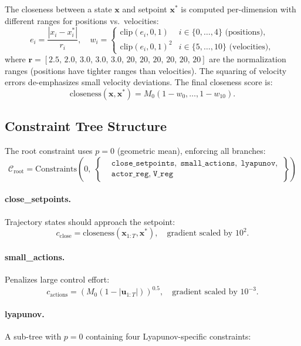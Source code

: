 \documentclass[11pt]{article}
\newcommand{\pmean}[2]{M_{#1}\!\left(#2\right)}
\newcommand{\x}{\bm{x}}
\newcommand{\xstar}{\bm{x}^*}
\newcommand{\uu}{\bm{u}}
\theoremstyle{definition}
\begin{document}
The closeness between a state $\x$ and setpoint $\xstar$ is computed
per-dimension with different ranges for positions vs.\ velocities:
\begin{equation}
    e_i = \frac{|x_i - x^*_i|}{r_i}, \quad
    w_i = \begin{cases}
        \text{clip}(e_i, 0, 1) & i \in \{0,\dots,4\} \text{ (positions)},\\
        \text{clip}(e_i, 0, 1)^2 & i \in \{5,\dots,10\} \text{ (velocities)},
    \end{cases}
\end{equation}
where $\bm{r} = [2.5,\, 2.0,\, 3.0,\, 3.0,\, 3.0,\, 20,\, 20,\, 20,\, 20,\, 20,\, 20]$
are the normalization ranges (positions have tighter ranges than velocities).
The squaring of velocity errors de-emphasizes small velocity deviations.
The final closeness score is:
\[
    \text{closeness}(\x, \xstar) = \pmean{0}{1 - w_0, \dots, 1 - w_{10}}.
\]

\subsection{Constraint Tree Structure}

The root constraint uses $p = 0$ (geometric mean), enforcing all branches:
\[
    \mathcal{C}_{\text{root}} = \text{Constraints}\!\left(0,\;
    \left\{
    \begin{aligned}
        &\texttt{close\_setpoints},\;
         \texttt{small\_actions},\;
         \texttt{lyapunov},\\
        &\texttt{actor\_reg},\;
         \texttt{V\_reg}
    \end{aligned}
    \right\}
    \right)
\]

\paragraph{close\_setpoints.}
Trajectory states should approach the setpoint:
\[
    c_{\text{close}} = \text{closeness}(\x_{1:T}, \xstar),
    \quad \text{gradient scaled by } 10^2.
\]

\paragraph{small\_actions.}
Penalizes large control effort:
\[
    c_{\text{actions}} = \left(\pmean{0}{1 - |\uu_{1:T}|}\right)^{0.5},
    \quad \text{gradient scaled by } 10^{-3}.
\]

\paragraph{lyapunov.}
A sub-tree with $p = 0$ containing four Lyapunov-specific constraints:
\end{document}
